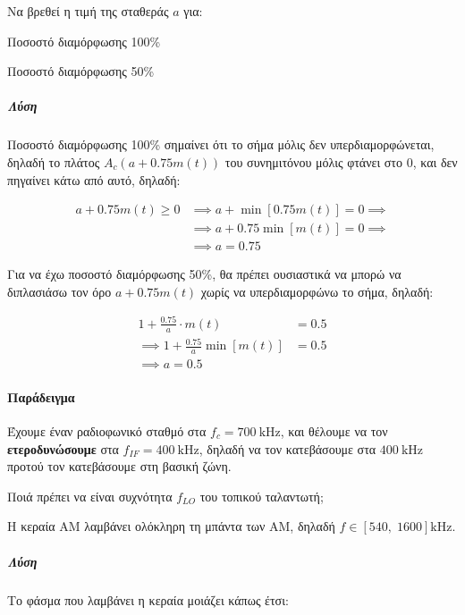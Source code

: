 \documentclass[11pt,a4paper,notitlepage,fleqn]{article}
\begin{document}
Να βρεθεί η τιμή της σταθεράς \( a \) για:
\begin{enumgreekparen}
	\item Ποσοστό διαμόρφωσης 100\%
	\item Ποσοστό διαμόρφωσης 50\%
\end{enumgreekparen}

\subparagraph{Λύση}
\begin{enumgreekparen}
	\item Ποσοστό διαμόρφωσης 100\% σημαίνει ότι το σήμα μόλις δεν υπερδιαμορφώνεται,
	δηλαδή το πλάτος \( A_c(a+0.75m(t)) \) του συνημιτόνου μόλις φτάνει στο 0, και δεν
	πηγαίνει κάτω από αυτό, δηλαδή:
	
	\begin{align*}
		a+0.75m(t) \geq 0 &\implies a+\min\left[0.75m(t)\right] = 0 \implies
		\\ &\implies a+0.75\min\left[m(t)\right] = 0 \implies \\& \implies
		\boxed{a=0.75}
	\end{align*}
	
	\item Για να έχω ποσοστό διαμόρφωσης 50\%, θα πρέπει ουσιαστικά να μπορώ να
	διπλασιάσω τον όρο \( a+0.75m(t) \) χωρίς να υπερδιαμορφώνω το σήμα, δηλαδή:
	
	\begin{align*}
		1+\frac{0.75}{a}\cdot m(t) &= 0.5 \\
		\implies 1+\frac{0.75}{a}\min\left[ m(t) \right] &= 0.5 \\
		\implies \boxed{a=0.5}
	\end{align*}
\end{enumgreekparen}

\paragraph{Παράδειγμα}
Έχουμε έναν ραδιοφωνικό σταθμό στα \( f_c = \SI{700}{\kilo\hertz} \), και θέλουμε να
τον \textbf{ετεροδυνώσουμε} στα \( f_{IF} = \SI{400}{\kilo\hertz} \), δηλαδή να
τον κατεβάσουμε στα \( \SI{400}{\kilo\hertz} \) προτού τον κατεβάσουμε στη βασική ζώνη.

Ποιά πρέπει να είναι συχνότητα \( f_{LO} \) του τοπικού ταλαντωτή;

Η κεραία AM λαμβάνει ολόκληρη τη μπάντα των AM, δηλαδή \( f \in \left[540,\;1600\right]
\si{\kilo\hertz} \).

\subparagraph{Λύση}
Το φάσμα που λαμβάνει η κεραία μοιάζει κάπως έτσι:
\end{document}
